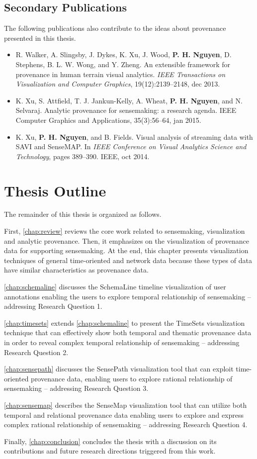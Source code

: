 \subsection{Secondary Publications} 
The following publications also contribute to the ideas about provenance presented in this thesis.

\begin{itemize}
\item R. Walker, A. Slingsby, J. Dykes, K. Xu, J. Wood, \textbf{P. H. Nguyen}, D. Stephens, B. L. W. Wong, and Y. Zheng. An extensible framework for provenance in human terrain visual analytics. \textit{IEEE Transactions on Visualization and Computer Graphics}, 19(12):2139--2148, dec 2013.
\item K. Xu, S. Attfield, T. J. Jankun-Kelly, A. Wheat, \textbf{P. H. Nguyen}, and N. Selvaraj. Analytic provenance for sensemaking: a research agenda. IEEE Computer Graphics and Applications, 35(3):56--64, jan 2015.
\item K. Xu, \textbf{P. H. Nguyen}, and B. Fields. Visual analysis of streaming data with SAVI and SenseMAP. In \textit{IEEE Conference on Visual Analytics Science and Technology}, pages 389--390. IEEE, oct 2014.
\end{itemize}

\section{Thesis Outline} 
The remainder of this thesis is organized as follows.

First, \autoref{chap:review} reviews the core work related to sensemaking, visualization and analytic provenance. Then, it emphasizes on the visualization of provenance data for supporting sensemaking. At the end, this chapter presents visualization techniques of general time-oriented and network data because these types of data have similar characteristics as provenance data.

\autoref{chap:schemaline} discusses the SchemaLine timeline visualization of user annotations enabling the users to explore temporal relationship of sensemaking -- addressing Research Question 1.

\autoref{chap:timesets} extends \autoref{chap:schemaline} to present the TimeSets visualization technique that can effectively show both temporal and thematic provenance data in order to reveal complex temporal relationship of sensemaking -- addressing Research Question 2.

\autoref{chap:sensepath} discusses the SensePath visualization tool that can exploit time-oriented provenance data, enabling users to explore rational relationship of sensemaking -- addressing Research Question 3.

\autoref{chap:sensemap} describes the SenseMap visualization tool that can utilize both temporal and relational provenance data enabling users to explore and express complex rational relationship of sensemaking -- addressing Research Question 4.

Finally, \autoref{chap:conclusion} concludes the thesis with a discussion on its contributions and future research directions triggered from this work.